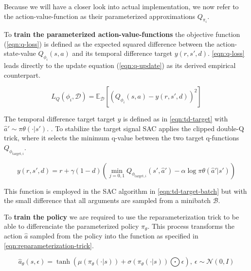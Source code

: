 Because we will have a closer look into actual implementation, we now refer to the action-value-function as their parameterized approximations $Q_{\pi_i}$.

To \textbf{train the parameterized action-value-functions} the objective function (\ref{eqn:q-loss}) is defined as the expected squared difference between the action-state-value $Q_{\phi_i}(s, a)$ and its temporal difference target $y(r, s', d)$. \eqref{eqn:q-loss} leads directly to the update equation (\ref{eqn:q-update}) as its derived empirical counterpart.

\begin{equation}\label{eqn:q-loss}
	L_Q(\phi_i, \mathcal{D}) = \mathbb{E}_\mathcal{D}\left[\left(Q_{\phi_i}(s, a) - y(r, s', d)\right)^2\right]
\end{equation}

The temporal difference target target $y$ is defined as in \eqref{eqn:td-target} with $\hat{a}' \sim \pi\theta(\cdot| s')$. . To stabilize the target signal SAC applies the clipped double-Q trick, where it selects the minimum q-value between the two target q-functions $Q_{\phi_{\text{target}, i}}$.

\begin{equation}\label{eqn:td-target}
	y(r, s', d) = r + \gamma(1 - d) \left(\min_{j=0,1}Q_{\phi_{\text{target}, i}}(s', \hat{a}') - \alpha \log \pi\theta(\hat{a}'| s')\right)
\end{equation} 

This function is employed in the SAC algorithm in \eqref{eqn:td-target-batch} but with the small difference that all arguments are sampled from a minibatch $\mathcal{B}$. 

To \textbf{train the policy} we are required to use the reparameterization trick to be able to differenciate the parameterized policy $\pi_\theta$. 
This process transforms the action $\hat{a}$ sampled from the policy into the function as specified in \eqref{eqn:reparameterization-trick}. 

\begin{equation}\label{eqn:reparameterization-trick}
	\hat{a}_\theta(s, \epsilon) = \tanh(\mu(\pi_\theta(\cdot|s)) + \sigma(\pi_\theta(\cdot|s)) \bigodot \epsilon), \ \epsilon \sim \mathcal{N}(0, I)
\end{equation}

